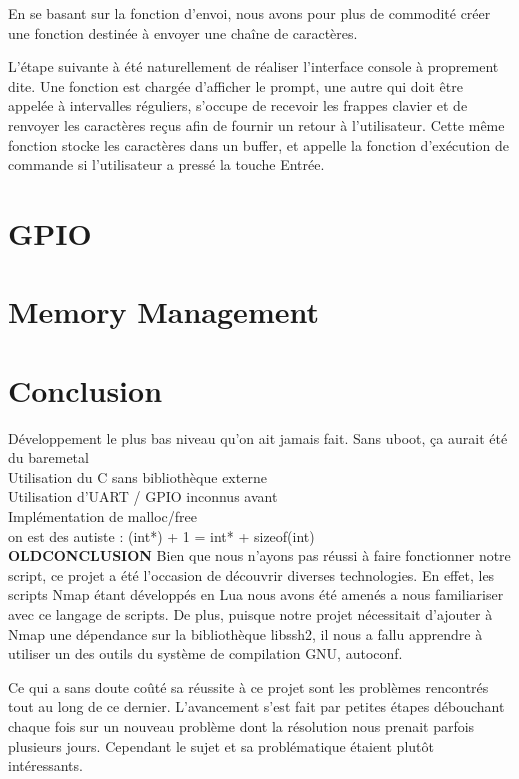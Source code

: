 \documentclass[frenchb]{article}
\begin{document}
En se basant sur la fonction d'envoi, nous avons pour plus de commodité créer une fonction destinée à envoyer une chaîne de caractères.

L'étape suivante à été naturellement de réaliser l'interface console à proprement dite. Une fonction est chargée d'afficher le prompt, une autre qui doit être appelée à intervalles réguliers, s'occupe de recevoir les frappes clavier et de renvoyer les caractères reçus afin de fournir un retour à l'utilisateur. Cette même fonction stocke les caractères dans un buffer, et appelle la fonction d'exécution de commande si l'utilisateur a pressé la touche Entrée.

%
\section{GPIO}

\section{Memory Management}

\clearpage

\section*{Conclusion}

\noindent Développement le plus bas niveau qu'on ait jamais fait. Sans uboot, ça aurait été du baremetal\\
Utilisation du C sans bibliothèque externe\\
Utilisation d'UART / GPIO inconnus avant\\
Implémentation de malloc/free\\
on est des autiste : (int*) + 1 = int* + sizeof(int)\\


{\Large\textbf{OLDCONCLUSION}}
Bien que nous n'ayons pas réussi à faire fonctionner notre script, ce projet a été l'occasion de découvrir diverses technologies. En effet, les scripts Nmap étant développés en Lua nous avons été amenés a nous familiariser avec ce langage de scripts. De plus, puisque notre projet nécessitait d'ajouter à Nmap une dépendance sur la bibliothèque \textsf{libssh2}, il nous a fallu apprendre à utiliser un des outils du système de compilation GNU, \textsf{autoconf}. 

Ce qui a sans doute coûté sa réussite à ce projet sont les problèmes rencontrés tout au long de ce dernier. L'avancement s'est fait par petites étapes débouchant chaque fois sur un nouveau problème dont la résolution nous prenait parfois plusieurs jours. Cependant le sujet et sa problématique étaient plutôt intéressants.
\end{document}
